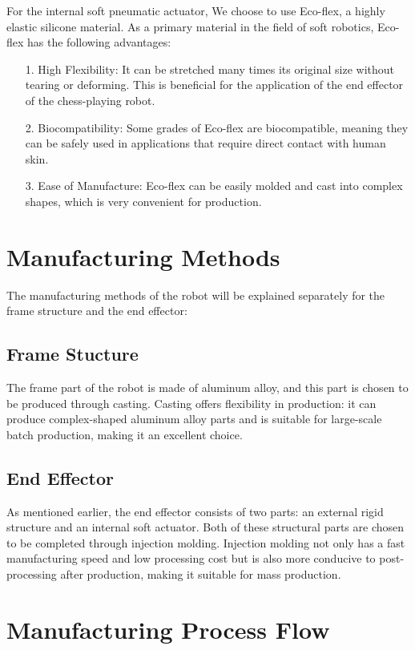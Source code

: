 \documentclass[10pt, a4paper, twocolumn]{article}
\begin{document}
For the internal soft pneumatic actuator, We choose to use Eco-flex, a highly elastic silicone material. As a primary material in the field of soft robotics, Eco-flex has the following advantages:

\begin{itemize}
    \item [1.] High Flexibility: It can be stretched many times its original size without tearing or deforming. This is beneficial for the application of the end effector of the chess-playing robot.
    \item [2.] Biocompatibility: Some grades of Eco-flex are biocompatible, meaning they can be safely used in applications that require direct contact with human skin.
    \item [3.] Ease of Manufacture: Eco-flex can be easily molded and cast into complex shapes, which is very convenient for production. 
\end{itemize}

\section{Manufacturing Methods}

The manufacturing methods of the robot will be explained separately for the frame structure and the end effector:

\subsection{Frame Stucture}
The frame part of the robot is made of aluminum alloy, and this part is chosen to be produced through casting. Casting offers flexibility in production: it can produce complex-shaped aluminum alloy parts and is suitable for large-scale batch production, making it an excellent choice.

\subsection{End Effector}
As mentioned earlier, the end effector consists of two parts: an external rigid structure and an internal soft actuator. Both of these structural parts are chosen to be completed through injection molding. Injection molding not only has a fast manufacturing speed and low processing cost but is also more conducive to post-processing after production, making it suitable for mass production.

\section{Manufacturing Process Flow}
\end{document}
